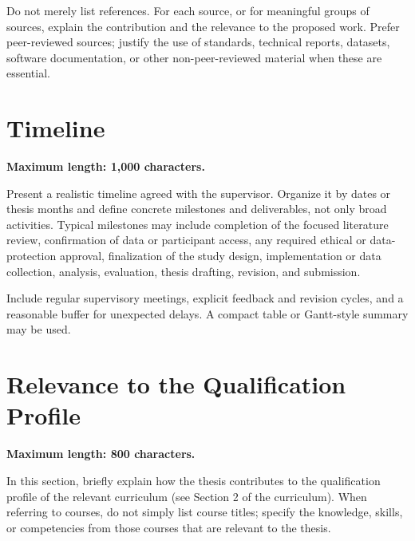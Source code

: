 \documentclass[runningheads]{llncs}
\begin{document}
Do not merely list references. For each source, or for meaningful groups of
sources, explain the contribution and the relevance to the proposed work. Prefer peer-reviewed sources; justify the use of standards,
technical reports, datasets, software documentation, or other non-peer-reviewed
material when these are essential.

\section{Timeline}
\textbf{Maximum length: 1,000 characters.}

Present a realistic timeline agreed with the supervisor. Organize it by dates
or thesis months and define concrete milestones and deliverables, not only
broad activities. Typical milestones may include completion of the focused
literature review, confirmation of data or participant access, any required
ethical or data-protection approval, finalization of the study design,
implementation or data collection, analysis, evaluation, thesis drafting,
revision, and submission.

Include regular supervisory meetings, explicit feedback and revision cycles, and a
reasonable buffer for unexpected delays. A compact table or Gantt-style summary may be used. 

\section{Relevance to the Qualification Profile}
\textbf{Maximum length: 800 characters.}

In this section, briefly explain how the thesis contributes to the qualification profile of the relevant curriculum (see Section 2 of the curriculum). When referring to courses, do not simply list course titles; specify the knowledge, skills, or competencies from those courses that are relevant to the thesis.

%
%
\end{document}
